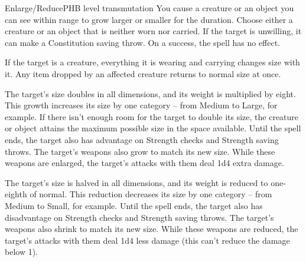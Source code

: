 \begin{spell}{Enlarge/Reduce}{PHB}{ level transmutation}
{
}
You cause a creature or an object you can see within
range to grow larger or smaller for the duration. Choose
either a creature or an object that is neither worn
nor carried. If the target is unwilling, it can make a
Constitution saving throw. On a success, the spell
has no effect.

If the target is a creature, everything it is wearing and
carrying changes size with it. Any item dropped by an
affected creature returns to normal size at once.

 The target's size doubles in all dimensions,
and its weight is multiplied by eight. This growth
increases its size by one category -- from Medium to
Large, for example. If there isn't enough room for the
target to double its size, the creature or object attains
the maximum possible size in the space available.
Until the spell ends, the target also has advantage on
Strength checks and Strength saving throws. The
target's weapons also grow to match its new size. While
these weapons are enlarged, the target's attacks with
them deal 1d4 extra damage.

 The target's size is halved in all dimensions,
and its weight is reduced to one-eighth of normal. This
reduction decreases its size by one category -- from
Medium to Small, for example. Until the spell ends,
the target also has disadvantage on Strength checks
and Strength saving throws. The target's weapons also
shrink to match its new size. While these weapons are
reduced, the target's attacks with them deal 1d4 less
damage (this can't reduce the damage below 1).
\end{spell}